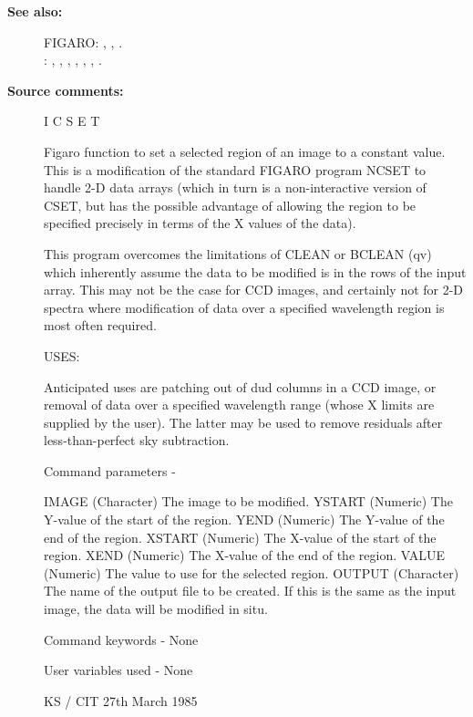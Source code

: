 \begin{description}
\begin{description}
\item [\textbf{See also:}]
FIGARO: , , .\\
: , , , , , , .\\

\item [\textbf{Source comments:}]
\begin{terminalv}
 I C S E T

 Figaro function to set a selected region of an image to a constant
 value.  This is a modification of the standard FIGARO program
 NCSET to handle 2-D data arrays (which in turn is a non-interactive
 version of CSET, but has the possible advantage of allowing the
 region to be specified precisely in terms of the X values of the
 data).

 This program overcomes the limitations of CLEAN or BCLEAN (qv)
 which inherently assume the data to be modified is in the rows
 of the input array. This may not be the case for CCD images, and
 certainly not for 2-D spectra where modification of data over a
 specified wavelength region is most often required.

 USES:

 Anticipated uses are patching out of dud columns in a CCD image,
 or removal of data over a specified wavelength range (whose X
 limits are supplied by the user). The latter may be used to remove
 residuals after less-than-perfect sky subtraction.

 Command parameters -

 IMAGE       (Character) The image to be modified.
 YSTART      (Numeric) The Y-value of the start of the region.
 YEND        (Numeric) The Y-value of the end of the region.
 XSTART      (Numeric) The X-value of the start of the region.
 XEND        (Numeric) The X-value of the end of the region.
 VALUE       (Numeric) The value to use for the selected region.
 OUTPUT      (Character) The name of the output file to
             be created.  If this is the same as the input
             image, the data will be modified in situ.

 Command keywords - None

 User variables used -  None

                                          KS / CIT 27th March 1985
\end{terminalv}
\end{description}

\end{description}
